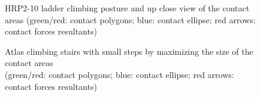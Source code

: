 \begin{figure}
\begin{subfigure}{.3325\columnwidth}
  \label{fig:hrp2_darpa}
\end{subfigure}%
\begin{subfigure}{.6175\columnwidth}
  \centering
  \setlength\fboxsep{0pt}
  \setlength\fboxrule{1pt}
  \label{fig:hrp2_darpa_zoom}
\end{subfigure}
\caption{HRP2-10 ladder climbing posture and up close view of the contact areas (green/red: contact polygons; blue: contact ellipse; red arrows: contact forces resultants)}
\label{fig:hrp2_darpa_complete}
\end{figure}

\begin{figure}
\centering
\setlength\fboxsep{0pt}
\setlength\fboxrule{1pt}
\caption{Atlas climbing stairs with small steps by maximizing the size of the contact areas\\(green/red: contact polygons; blue: contact ellipse; red arrows: contact forces resultants)}
\label{fig:atlas_SmallStairs}
\end{figure}  

